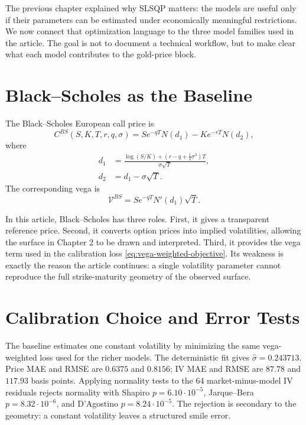 \documentclass[a4paper,10pt,titlepage,oneside,openany]{book}
\theoremstyle{plain}
\theoremstyle{definition}
\theoremstyle{remark}
\newcommand{\vega}{\mathcal{V}}
\begin{document}
The previous chapter explained why SLSQP matters: the models are useful only if their parameters can be estimated under economically meaningful restrictions. We now connect that optimization language to the three model families used in the article. The goal is not to document a technical workflow, but to make clear what each model contributes to the gold-price block.

\section{Black--Scholes as the Baseline}

The Black--Scholes European call price is
\begin{equation}
    C^{BS}(S,K,T,r,q,\sigma)
    =
    S e^{-qT}N(d_1)-K e^{-rT}N(d_2),
\end{equation}
where
\begin{align}
    d_1 &=
    \frac{\log(S/K)+(r-q+\frac{1}{2}\sigma^2)T}{\sigma\sqrt{T}},\\
    d_2 &= d_1-\sigma\sqrt{T}.
\end{align}
The corresponding vega is
\begin{equation}
    \vega^{BS}
    =
    S e^{-qT} N'(d_1)\sqrt{T}.
\end{equation}

In this article, Black--Scholes has three roles. First, it gives a transparent reference price. Second, it converts option prices into implied volatilities, allowing the surface in Chapter 2 to be drawn and interpreted. Third, it provides the vega term used in the calibration loss \eqref{eq:vega-weighted-objective}. Its weakness is exactly the reason the article continues: a single volatility parameter cannot reproduce the full strike-maturity geometry of the observed surface.

\section{Calibration Choice and Error Tests}

The baseline estimates one constant volatility by minimizing the same vega-weighted loss used for the richer models. The deterministic fit gives \(\widehat\sigma=0.243713\). Price MAE and RMSE are \(0.6375\) and \(0.8156\); IV MAE and RMSE are \(87.78\) and \(117.93\) basis points. Applying normality tests to the 64 market-minus-model IV residuals rejects normality with Shapiro \(p=6.10\cdot10^{-5}\), Jarque--Bera \(p=8.32\cdot10^{-6}\), and D'Agostino \(p=8.24\cdot10^{-5}\). The rejection is secondary to the geometry: a constant volatility leaves a structured smile error.
\end{document}
